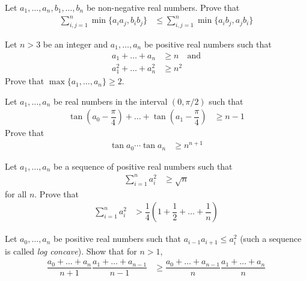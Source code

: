 \documentclass{subfile}
\begin{document}
		\begin{problem}
			Let $a_{1},\ldots,a_{n},b_{1},\ldots,b_{n}$ be non-negative real numbers. Prove that
				\begin{align*}
					\sum_{i,j=1}^{n}\min\{a_{i}a_{j},b_{i}b_{j}\}
						& \leq\sum_{i,j=1}^{n}\min\{a_{i}b_{j},a_{j}b_{i}\}
				\end{align*}
		\end{problem}
	
		\begin{problem}
			Let $n>3$ be an integer and $a_{1},\ldots,a_{n}$ be positive real numbers such that
				\begin{align*}
					a_{1}+\ldots+a_{n}
						& \geq n\quad\mbox{and}\\
					a_{1}^{2}+\ldots+a_{n}^{2}
						& \geq n^{2}
				\end{align*}
			Prove that $\max\{a_{1},\ldots,a_{n}\}\geq2$.
		\end{problem}
	
		\begin{problem}
			Let $a_{1},\ldots,a_{n}$ be real numbers in the interval $(0,\pi/2)$ such that
				\begin{align*}
					\tan\left(a_{0}-\dfrac{\pi}{4}\right)+\ldots+\tan\left(a_{1}-\dfrac{\pi}{4}\right)
						& \geq n-1
				\end{align*}
			Prove that
				\begin{align*}
					\tan{a_{0}}\cdots\tan{a_{n}}
						& \geq n^{n+1}
				\end{align*}
		\end{problem}
	
		\begin{problem}
			Let $a_{1},\ldots,a_{n}$ be a sequence of positive real numbers such that
				\begin{align*}
					\sum_{i=1}^{n}a_{i}^{2}
						& \geq \sqrt{n}
				\end{align*}
			for all $n$. Prove that
				\begin{align*}
					\sum_{i=1}^{n}a_{i}^{2}
						& > \dfrac{1}{4}\left(1+\dfrac{1}{2}+\ldots+\dfrac{1}{n}\right)
				\end{align*}
		\end{problem}
	
		\begin{problem}
			Let $a_{0},\ldots,a_{n}$ be positive real numbers such that $a_{i-1}a_{i+1}\leq a_{i}^2$ (such a sequence is called \textit{log concave}). Show that for $n>1$,
				\begin{align*}
					\dfrac{a_{0}+\ldots+a_{n}}{n+1}\dfrac{a_{1}+\ldots+a_{n-1}}{n-1}
						& \geq\dfrac{a_{0}+\ldots+a_{n-1}}{n}\dfrac{a_{1}+\ldots+a_{n}}{n}
				\end{align*}
		\end{problem}
	
\end{document}
